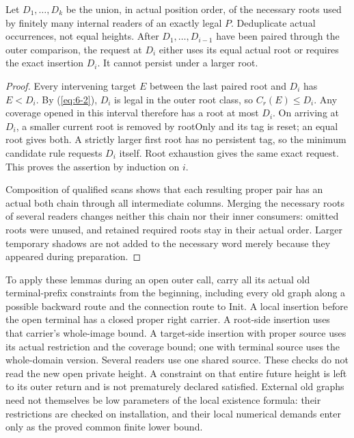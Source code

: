 \begin{lemma}
\label{lem:exact-support}
Let $D_1,\ldots,D_k$ be the union, in actual position order, of the
necessary roots used by finitely many internal readers of an exactly
legal $P$. Deduplicate actual occurrences, not equal heights. After
$D_1,\ldots,D_{i-1}$ have been paired through the outer comparison,
the request at $D_i$ either uses its equal actual root or requires the
exact insertion $D_i$. It cannot persist under a larger root.
\end{lemma}
\begin{proof}
Every intervening target $E$ between the last paired root and $D_i$
has $E<D_i$. By (\ref{eq:6-2}), $D_i$ is legal in the outer root class, so
$C_r(E)\le D_i$. Any coverage opened in this interval therefore has a
root at most $D_i$. On arriving at $D_i$, a smaller current root is
removed by rootOnly and its tag is reset; an equal root gives both.
A strictly larger first root has no persistent tag, so the minimum
candidate rule requests $D_i$ itself. Root exhaustion gives the same
exact request. This proves the assertion by induction on $i$.

Composition of qualified scans shows that each resulting proper pair
has an actual both chain through all intermediate columns. Merging the
necessary roots of several readers changes neither this chain nor their
inner consumers: omitted roots were unused, and retained required roots
stay in their actual order. Larger temporary shadows are not added to
the necessary word merely because they appeared during preparation.
\end{proof}

To apply these lemmas during an open outer call, carry all its actual
old terminal-prefix constraints from the beginning, including every
old graph along a possible backward route and the connection route to
Init. A local insertion before the open terminal has a closed proper
right carrier. A root-side insertion uses that carrier's whole-image
bound. A target-side insertion with proper source uses its actual
restriction and the coverage bound; one with terminal source uses the
whole-domain version. Several readers use one shared source. These
checks do not read the new open private height. A constraint on that
entire future height is left to its outer return and is not prematurely
declared satisfied. External old graphs need not themselves be low
parameters of the local existence formula: their restrictions are
checked on installation, and their local numerical demands enter only
as the proved common finite lower bound.

